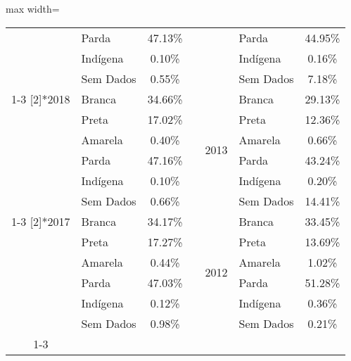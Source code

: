 \documentclass[14pt]{extarticle}
\begin{document}
\begin{table}[htbp]
\begin{adjustbox}{max width=\linewidth}
\begin{tabular}{clccclc}
         & Parda & 47.13\% &      &      & Parda & 44.95\% \\
         & Indígena & 0.10\% &      &      & Indígena & 0.16\% \\
         & Sem Dados & 0.55\% &      &      & Sem Dados & 7.18\% \\
\cmidrule{1-3}\cmidrule{5-7}    \multirow{6}[2]{*}{2018} & Branca & 34.66\% &      & \multirow{6}[2]{*}{2013} & Branca & 29.13\% \\
         & Preta & 17.02\% &      &      & Preta & 12.36\% \\
         & Amarela & 0.40\% &      &      & Amarela & 0.66\% \\
         & Parda & 47.16\% &      &      & Parda & 43.24\% \\
         & Indígena & 0.10\% &      &      & Indígena & 0.20\% \\
         & Sem Dados & 0.66\% &      &      & Sem Dados & 14.41\% \\
\cmidrule{1-3}\cmidrule{5-7}    \multirow{6}[2]{*}{2017} & Branca & 34.17\% &      & \multirow{6}[2]{*}{2012} & Branca & 33.45\% \\
         & Preta & 17.27\% &      &      & Preta & 13.69\% \\
         & Amarela & 0.44\% &      &      & Amarela & 1.02\% \\
         & Parda & 47.03\% &      &      & Parda & 51.28\% \\
         & Indígena & 0.12\% &      &      & Indígena & 0.36\% \\
         & Sem Dados & 0.98\% &      &      & Sem Dados & 0.21\% \\
\cmidrule{1-3}\cmidrule{5-7}    
\end{tabular}%
\end{adjustbox}
  \label{tab:tab_cor1}%
\end{table}%
\end{document}
